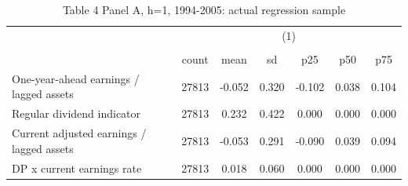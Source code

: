 \begin{table}[htbp]\centering
\def\sym#1{\ifmmode^{#1}\else\(^{#1}\)\fi}
\caption{Table 4 Panel A, h=1, 1994-2005: actual regression sample}
\begin{tabular}{l*{1}{cccccc}}
\hline\hline
                    &\multicolumn{6}{c}{(1)}                                                      \\
                    &\multicolumn{6}{c}{}                                                         \\
                    &       count&        mean&          sd&         p25&         p50&         p75\\
\hline
One-year-ahead earnings / lagged assets&       27813&      -0.052&       0.320&      -0.102&       0.038&       0.104\\
Regular dividend indicator&       27813&       0.232&       0.422&       0.000&       0.000&       0.000\\
Current adjusted earnings / lagged assets&       27813&      -0.053&       0.291&      -0.090&       0.039&       0.094\\
DP x current earnings rate&       27813&       0.018&       0.060&       0.000&       0.000&       0.000\\
\hline\hline
\end{tabular}
\end{table}
